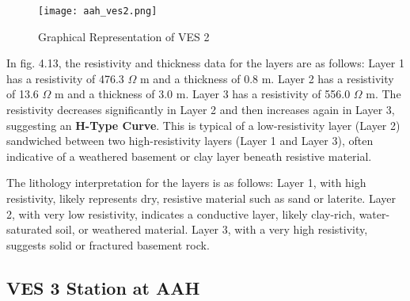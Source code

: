 \documentclass[12pt,a4paper]{report}
\begin{document}
\begin{figure}[H]
    \centering
    \texttt{[image: aah\_ves2.png]}
    \caption{Graphical Representation of VES 2}
    \label{fig:AAH_VES_2_Curve}
\end{figure}

In fig.  4.13, the resistivity and thickness data for the layers are as follows: Layer 1 has a resistivity of 476.3 $\Omega$ m and a thickness of 0.8 m. Layer 2 has a resistivity of 13.6 $\Omega$ m and a thickness of 3.0 m. Layer 3 has a resistivity of 556.0 $\Omega$ m. The resistivity decreases significantly in Layer 2 and then increases again in Layer 3, suggesting an \textbf{H-Type Curve}. This is typical of a low-resistivity layer (Layer 2) sandwiched between two high-resistivity layers (Layer 1 and Layer 3), often indicative of a weathered basement or clay layer beneath resistive material.

The lithology interpretation for the layers is as follows: Layer 1, with high resistivity, likely represents dry, resistive material such as sand or laterite. Layer 2, with very low resistivity, indicates a conductive layer, likely clay-rich, water-saturated soil, or weathered material. Layer 3, with a very high resistivity, suggests solid or fractured basement rock.

\subsection{VES 3 Station at AAH}
\end{document}
